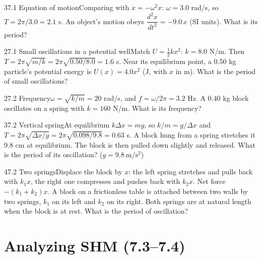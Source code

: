 \documentclass[11pt]{article}
\begin{document}
\begin{q}{3}{7.1 Equation of motion}{Comparing with $\ddot x = -\omega^2 x$: $\omega = 3.0$ rad/s, so $T = 2\pi/3.0 = 2.1$ s.}
An object's motion obeys $\dfrac{d^2x}{dt^2} = -9.0\,x$ (SI units). What is its period?
\end{q}
\begin{q}{2}{7.1 Small oscillations in a potential well}{Match $U = \tfrac12 kx^2$: $k = 8.0$ N/m. Then $T = 2\pi\sqrt{m/k} = 2\pi\sqrt{0.50/8.0} = 1.6$ s.}
Near its equilibrium point, a 0.50 kg particle's potential energy is $U(x) = 4.0x^2$ (J, with $x$ in m). What is the period of small oscillations?
\end{q}
\begin{q}{2}{7.2 Frequency}{$\omega = \sqrt{k/m} = 20$ rad/s, and $f = \omega/2\pi = 3.2$ Hz.}
A 0.40 kg block oscillates on a spring with $k = 160$ N/m. What is its frequency?
\end{q}
\begin{q}{3}{7.2 Vertical spring}{At equilibrium $k\Delta x = mg$, so $k/m = g/\Delta x$ and $T = 2\pi\sqrt{\Delta x/g} = 2\pi\sqrt{0.098/9.8} = 0.63$ s.}
A block hung from a spring stretches it 9.8 cm at equilibrium. The block is then pulled down slightly and released. What is the period of its oscillation? ($g = 9.8\ \mathrm{m/s^2}$)
\end{q}
\begin{q}{4}{7.2 Two springs}{Displace the block by $x$: the left spring stretches and pulls back with $k_1x$, the right one compresses and pushes back with $k_2x$. Net force $-(k_1 + k_2)x$.}
A block on a frictionless table is attached between two walls by two springs, $k_1$ on its left and $k_2$ on its right. Both springs are at natural length when the block is at rest. What is the period of oscillation?
\end{q}

\section{Analyzing SHM (7.3--7.4)}
\end{document}
